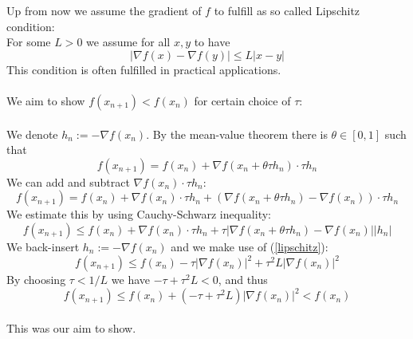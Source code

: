 \documentclass[17pt]{extarticle}
\begin{document}
Up from now we assume the gradient of $f$ to fulfill as so called Lipschitz condition:\\
For some $L>0$ we assume for all $x,y$ to have
\begin{equation} \label{lipschitz}
	|\nabla f(x)-\nabla f(y)|\leq L|x-y|
\end{equation}
This condition is often fulfilled in practical applications.\\ \\
We aim to show $f(x_{n+1})<f(x_n)$ for certain choice of $\tau$: \\ \\

We denote $h_n:=-\nabla f(x_n)$.
By the mean-value theorem there is $\theta\in [0,1]$ such that
$$
f(x_{n+1})=f(x_n)+\nabla f(x_n+\theta\tau h_n)\cdot \tau h_n
$$
We can add and subtract $\nabla f(x_n)\cdot \tau h_n$:
$$
f(x_{n+1})=f(x_n)+\nabla f(x_n)\cdot \tau h_n
+(\nabla f(x_n+\theta\tau h_n)-\nabla f(x_n))\cdot \tau h_n
$$
We estimate this by using Cauchy-Schwarz inequality:
$$
f(x_{n+1})\leq f(x_n)+\nabla f(x_n)\cdot \tau h_n
+\tau|\nabla f(x_n+\theta\tau h_n)-\nabla f(x_n)||h_n|
$$
We back-insert $h_n:=-\nabla f(x_n)$ and we make use of (\ref{lipschitz}):
$$
f(x_{n+1})\leq f(x_n)-\tau|\nabla f(x_n)|^2
+\tau^2 L|\nabla f(x_n)|^2
$$
By choosing $\tau< 1/L$ we have $-\tau+\tau^2 L<0$, and thus
$$
f(x_{n+1})\leq f(x_n)+(-\tau+\tau^2 L)|\nabla f(x_n)|^2<f(x_n)
$$\\
This was our aim to show.


	
\end{document}
